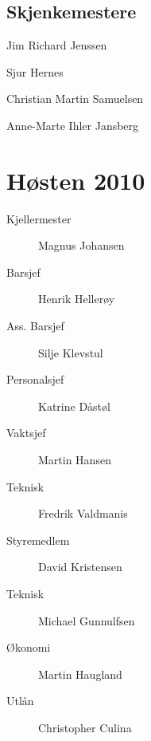 \subsection*{Skjenkemestere}

\begin{description}
	\item Jim Richard Jenssen
	\item Sjur Hernes
	\item Christian Martin Samuelsen
	\item Anne-Marte Ihler Jansberg
\end{description}

\section*{Høsten 2010}

\begin{description}
	\item[Kjellermester] Magnus Johansen
	\item[Barsjef] Henrik Hellerøy
 	\item[Ass. Barsjef] Silje Klevstul
	\item[Personalsjef] Katrine Dåstøl
	\item[Vaktsjef] Martin Hansen
	\item[Teknisk] Fredrik Valdmanis
	\item[Styremedlem] David Kristensen
	\item[Teknisk] Michael Gunnulfsen
	\item[Økonomi] Martin Haugland
	\item[Utlån] Christopher Culina
\end{description}
